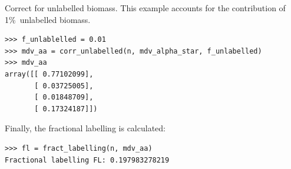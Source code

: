 Correct for unlabelled biomass. This example accounts for the contribution
of 1\%\ unlabelled biomass.

\begin{verbatim}
>>> f_unlablelled = 0.01 
>>> mdv_aa = corr_unlabelled(n, mdv_alpha_star, f_unlabelled)
>>> mdv_aa
array([[ 0.77102099],
       [ 0.03725005],
       [ 0.01848709],
       [ 0.17324187]])
\end{verbatim}

Finally, the fractional labelling is calculated:

\begin{verbatim}
>>> fl = fract_labelling(n, mdv_aa)
Fractional labelling FL: 0.197983278219
\end{verbatim}

